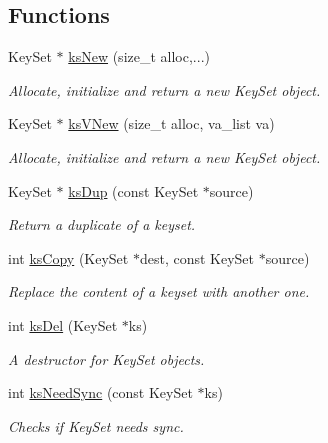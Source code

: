 \subsection*{Functions}
\begin{DoxyCompactItemize}
\item 
Key\+Set $\ast$ \mbox{\hyperlink{group__keyset_ga671e1aaee3ae9dc13b4834a4ddbd2c3c}{ks\+New}} (size\+\_\+t alloc,...)
\begin{DoxyCompactList}\small\item\em Allocate, initialize and return a new Key\+Set object. \end{DoxyCompactList}\item 
Key\+Set $\ast$ \mbox{\hyperlink{group__keyset_ga4ff760f56693b51ab785ed7ce628e649}{ks\+V\+New}} (size\+\_\+t alloc, va\+\_\+list va)
\begin{DoxyCompactList}\small\item\em Allocate, initialize and return a new Key\+Set object. \end{DoxyCompactList}\item 
Key\+Set $\ast$ \mbox{\hyperlink{group__keyset_gac59e4b328245463f1451f68d5106151c}{ks\+Dup}} (const Key\+Set $\ast$source)
\begin{DoxyCompactList}\small\item\em Return a duplicate of a keyset. \end{DoxyCompactList}\item 
int \mbox{\hyperlink{group__keyset_gaba1f1dbea191f4d7e7eb3e4296ae7d5e}{ks\+Copy}} (Key\+Set $\ast$dest, const Key\+Set $\ast$source)
\begin{DoxyCompactList}\small\item\em Replace the content of a keyset with another one. \end{DoxyCompactList}\item 
int \mbox{\hyperlink{group__keyset_ga27e5c16473b02a422238c8d970db7ac8}{ks\+Del}} (Key\+Set $\ast$ks)
\begin{DoxyCompactList}\small\item\em A destructor for Key\+Set objects. \end{DoxyCompactList}\item 
int \mbox{\hyperlink{group__keyset_ga8f210432e664d8ba06d7d55a2aba2d0f}{ks\+Need\+Sync}} (const Key\+Set $\ast$ks)
\begin{DoxyCompactList}\small\item\em Checks if Key\+Set needs sync. \end{DoxyCompactList}\item 

\end{DoxyCompactItemize}
